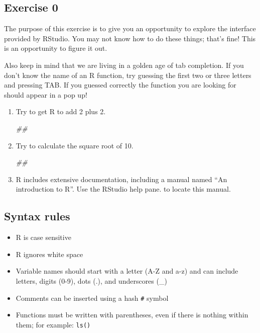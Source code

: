 \documentclass[
]{book}
\newenvironment{Shaded}{\begin{snugshade}}{\end{snugshade}}
\newcommand{\CommentTok}[1]{\textcolor[rgb]{0.56,0.35,0.01}{\textit{#1}}}
\providecommand{\tightlist}{%
  \setlength{\itemsep}{0pt}\setlength{\parskip}{0pt}}
\begin{document}
\hypertarget{exercise-0}{%
\subsection{Exercise 0}\label{exercise-0}}

The purpose of this exercise is to give you an opportunity to explore
the interface provided by RStudio. You may not know how to do these things;
that's fine! This is an opportunity to figure it out.

Also keep in mind that we are living in a golden age of tab completion.
If you don't know the name of an R function, try guessing the first two
or three letters and pressing TAB. If you guessed correctly the function
you are looking for should appear in a pop up!

\begin{enumerate}
\def\labelenumi{\arabic{enumi}.}
\item
  Try to get R to add 2 plus 2.

\begin{Shaded}
\begin{Highlighting}[]
\CommentTok{##}
\end{Highlighting}
\end{Shaded}
\item
  Try to calculate the square root of 10.

\begin{Shaded}
\begin{Highlighting}[]
\CommentTok{##}
\end{Highlighting}
\end{Shaded}
\item
  R includes extensive documentation, including a manual named ``An
  introduction to R''. Use the RStudio help pane. to locate this manual.
\end{enumerate}

\hypertarget{syntax-rules}{%
\subsection{Syntax rules}\label{syntax-rules}}

\begin{itemize}
\tightlist
\item
  R is case sensitive
\item
  R ignores white space
\item
  Variable names should start with a letter (A-Z and a-z)
  and can include letters, digits (0-9), dots (.), and underscores (\_)
\item
  Comments can be inserted using a hash \texttt{\#} symbol
\item
  Functions must be written with parentheses, even
  if there is nothing within them; for example: \texttt{ls()}
\end{itemize}
\end{document}
